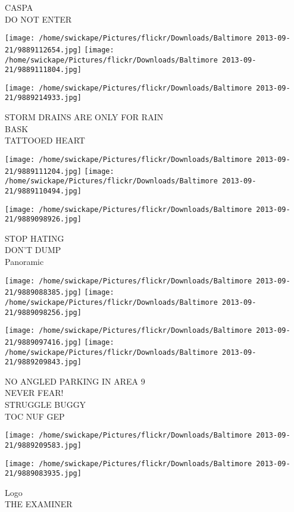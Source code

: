 \documentclass[10pt,letterpaper]{article}
\begin{document}
CASPA\\
DO NOT ENTER
\pagebreak

\texttt{[image: /home/swickape/Pictures/flickr/Downloads/Baltimore 2013-09-21/9889112654.jpg]}
\texttt{[image: /home/swickape/Pictures/flickr/Downloads/Baltimore 2013-09-21/9889111804.jpg]}

\vspace{0.25in}
\texttt{[image: /home/swickape/Pictures/flickr/Downloads/Baltimore 2013-09-21/9889214933.jpg]}

STORM DRAINS ARE ONLY FOR RAIN\\
BASK\\
TATTOOED HEART
\pagebreak

\texttt{[image: /home/swickape/Pictures/flickr/Downloads/Baltimore 2013-09-21/9889111204.jpg]}
\texttt{[image: /home/swickape/Pictures/flickr/Downloads/Baltimore 2013-09-21/9889110494.jpg]}

\vspace{0.25in}
\texttt{[image: /home/swickape/Pictures/flickr/Downloads/Baltimore 2013-09-21/9889098926.jpg]}

STOP HATING\\
DON'T DUMP\\
Panoramic
\pagebreak

\texttt{[image: /home/swickape/Pictures/flickr/Downloads/Baltimore 2013-09-21/9889088385.jpg]}
\texttt{[image: /home/swickape/Pictures/flickr/Downloads/Baltimore 2013-09-21/9889098256.jpg]}

\texttt{[image: /home/swickape/Pictures/flickr/Downloads/Baltimore 2013-09-21/9889097416.jpg]}
\texttt{[image: /home/swickape/Pictures/flickr/Downloads/Baltimore 2013-09-21/9889209843.jpg]}

NO ANGLED PARKING IN AREA 9\\
NEVER FEAR!\\
STRUGGLE BUGGY\\
TOC NUF GEP
\pagebreak

\texttt{[image: /home/swickape/Pictures/flickr/Downloads/Baltimore 2013-09-21/9889209583.jpg]}

\vspace{0.25in}
\texttt{[image: /home/swickape/Pictures/flickr/Downloads/Baltimore 2013-09-21/9889083935.jpg]}

Logo\\
THE EXAMINER
\pagebreak
\end{document}
